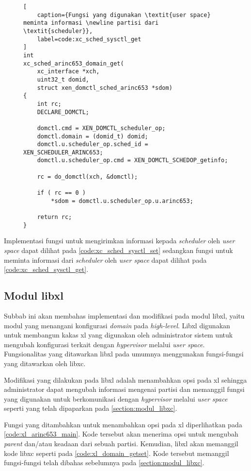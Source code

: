 \begin{figure}
\begin{lstlisting}[
	caption={Fungsi yang digunakan \textit{user space} meminta informasi \newline partisi dari \textit{scheduler}},
	label=code:xc_sched_sysctl_get
]
int
xc_sched_arinc653_domain_get(
    xc_interface *xch,
    uint32_t domid,
    struct xen_domctl_sched_arinc653 *sdom)
{
    int rc;
    DECLARE_DOMCTL;

    domctl.cmd = XEN_DOMCTL_scheduler_op;
    domctl.domain = (domid_t) domid;
    domctl.u.scheduler_op.sched_id = XEN_SCHEDULER_ARINC653;
    domctl.u.scheduler_op.cmd = XEN_DOMCTL_SCHEDOP_getinfo;

    rc = do_domctl(xch, &domctl);

    if ( rc == 0 )
        *sdom = domctl.u.scheduler_op.u.arinc653;

    return rc;
}
\end{lstlisting}
\end{figure}

Implementasi fungsi untuk mengirimkan informasi kepada \textit{scheduler} oleh \textit{user
space} dapat dilihat pada \autoref{code:xc_sched_sysctl_set} sedangkan fungsi untuk meminta
informasi dari \textit{scheduler} oleh \textit{user space} dapat dilihat pada
\autoref{code:xc_sched_sysctl_get}.

\subsection{Modul libxl}
\label{section:modul_libxl}

Subbab ini akan membahas implementasi dan modifikasi pada modul libxl, yaitu modul yang
menangani konfigurasi \textit{domain} pada \textit{high-level}. Libxl digunakan untuk membangun
kakas xl yang digunakan oleh administrator sistem untuk mengubah konfigurasi terkait dengan
\textit{hypervisor} melalui \textit{user space}. Fungsionalitas yang ditawarkan libxl pada
umumnya menggunakan fungsi-fungsi yang ditawarkan oleh libxc.

Modifikasi yang dilakukan pada libxl adalah menambahkan opsi pada xl sehingga administrator
dapat mengubah informasi mengenai partisi dan memanggil fungsi yang digunakan untuk
berkomunikasi dengan \textit{hypervisor} melalui \textit{user space} seperti yang telah
dipaparkan pada \autoref{section:modul_libxc}.

Fungsi yang ditambahkan untuk menambahkan opsi pada xl diperlihatkan pada
\autoref{code:xl_arinc653_main}. Kode tersebut akan menerima opsi untuk mengubah \textit{parent}
dan/atau keadaan dari sebuah partisi. Kemudian, libxl akan memanggil kode libxc seperti pada
\autoref{code:xl_domain_getset}. Kode tersebut memanggil fungsi-fungsi telah dibahas sebelumnya
pada \autoref{section:modul_libxc}.

